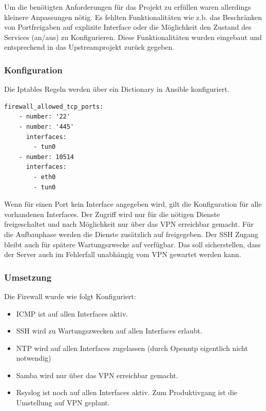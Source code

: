 Um die benötigten Anforderungen für das Projekt zu erfüllen waren allerdings kleinere Anpassungen nötig. Es fehlten  Funktionalitäten wie z.b. das Beschränken von Portfreigaben auf explizite Interface oder die Möglichkeit den Zustand des Services (an/aus) zu Konfigurieren. Diese Funktionalitäten wurden eingebaut und entsprechend in das Upstreamprojekt zurück gegeben.

\subsubsection{Konfiguration}
Die Iptables Regeln werden über ein Dictionary in Ansible konfiguriert.

\begin{lstlisting}[label=code:smbconf5,caption=Auszug aus der Datei ansible/group\_vars/file\_server\_sued/public]
  firewall_allowed_tcp_ports:
    - number: '22'
    - number: '445'
      interfaces:
        - tun0
    - number: 10514
      interfaces:
        - eth0
        - tun0
\end{lstlisting}

Wenn für einen Port kein Interface angegeben wird, gilt die Konfiguration für alle vorhandenen Interfaces. Der Zugriff wird nur für die nötigen Dienste freigeschaltet und nach Möglichkeit nur über das VPN erreichbar gemacht. Für die Aufbauphase werden die Dienste zusätzlich auf  freigegeben. Der SSH Zugang bleibt auch für spätere Wartungszwecke auf  verfügbar. Das soll sicherstellen, dass der Server auch im Fehlerfall unabhängig vom VPN gewartet werden kann.

\subsubsection{Umsetzung}
Die Firewall wurde wie folgt Konfiguriert:
\begin{itemize}
\item ICMP ist auf allen Interfaces aktiv.
\item SSH wird zu Wartungszwecken auf allen Interfaces erlaubt.
\item NTP wird auf allen Interfaces zugelassen (durch Openntp eigentlich nicht notwendig)
\item Samba wird nur über das VPN erreichbar gemacht.
\item Rsyslog ist noch auf allen Interfaces aktiv. Zum Produktivgang ist die Umstellung auf VPN geplant.
\end{itemize}

